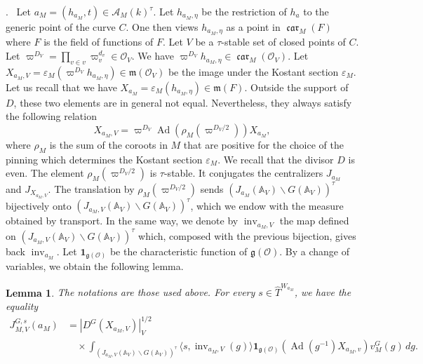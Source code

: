 \documentclass[12pt,a4paper,oneside,english,leqno]{smfart}
\makeatletter
\numberwithin{equation}{subsection}
\newcounter{theo}
\numberwithin{theo}{subsection}
\newenvironment{paragr}[1][]{\medskip\refstepcounter{subsection}%
  \par\noindent\hspace*{\parindent}\thesubsection.\ \emph{#1}%
  \@ifundefined{@empty}{}{}\ignorespaces}{\medskip}
\theoremstyle{plain}
\newtheorem{lemma}[theo]{Lemma}
\theoremstyle{definition}
\theoremstyle{remark}
\DeclareMathOperator{\Ad}{Ad}
\DeclareMathOperator{\inv}{inv}
\DeclareMathOperator{\car}{\mathfrak{car}}
\newcommand{\AAA}{\mathbb{A}}
\newcommand{\oc}{\mathcal{O}}
\newcommand{\Ac}{\mathcal{A}}
\newcommand{\Tc}{\widehat{T}}
\newcommand{\ggo}{\mathfrak{g}}
\newcommand{\mgo}{\mathfrak{m}}
\newcommand{\back}{\backslash}
\newcommand{\bg}{\langle}
\newcommand{\bd}{\rangle}
\newcommand{\eps}{\varepsilon}
\makeatother
\begin{document}
\begin{paragr}\label{S:17.5}
Let $a_M=(h_{a_M},t)\in\Ac_M(k)^\tau$. Let $h_{a_M,\eta}$ be the restriction of $h_a$ to the generic point of the curve $C$. One then views $h_{a_M,\eta}$ as a point in $\car_M(F)$ where $F$ is the field of functions of $F$. Let $V$ be a $\tau$-stable set of closed points of $C$. Let $\varpi^{D_V}=\prod_{v\in v}\varpi_v^{d_v}\in\oc_V$. We have $\varpi^{D_V}h_{a_M,\eta}\in\car_M(\oc_V)$. Let $X_{a_M,V}=\eps_M(\varpi^{D_V}h_{a_M,\eta})\in\mgo(\oc_V)$ be the image under the Kostant section $\eps_M$. Let us recall that we have $X_{a_M}=\eps_M(h_{a_M,\eta})\in\mgo(F)$. Outside the support of $D$, these two elements are in general not equal. Nevertheless, they always satisfy the following relation
$$
X_{a_M,V}=\varpi^{D_V}\Ad(\rho_M(\varpi^{D_V/2}))X_{a_M},
$$
where $\rho_M$ is the sum of the coroots in $M$ that are positive for the choice of the pinning which determines the Kostant section $\eps_M$. We recall that the divisor $D$ is even. The element $\rho_M(\varpi^{D_V/2})$ is $\tau$-stable. It conjugates the centralizers $J_{a_M}$ and $J_{X_{a_M,V}}$. The translation by $\rho_M(\varpi^{D_V/2})$ sends $(J_{a_M}(\AAA_V)\back G(\AAA_V))^\tau$ bijectively onto $(J_{a_M,V}(\AAA_V)\back G(\AAA_V))^\tau$, which we endow with the measure obtained by transport. In the same way, we denote by $\inv_{a_M,V}$ the map defined on $(J_{a_M,V}(\AAA_V)\back G(\AAA_V))^\tau$ which, composed with the previous bijection, gives back $\inv_{a_M}$. Let $\mathbf{1}_{\ggo(\oc)}$ be the characteristic function of $\ggo(\oc)$. By a change of variables, we obtain the following lemma.

\begin{lemma}\label{thm:17.5.1}
The notations are those used above. For every $s\in\Tc^{W_{a_M}}$, we have the equality
\[
\begin{aligned}
J^{G,s}_{M,V}(a_M)&=|D^G(X_{a_M,V})|_V^{1/2}\\
&\quad\times\int_{(J_{a_M,V}(\AAA_V)\back G(\AAA_V))^\tau}
\bg s,\inv_{a_M,V}(g)\bd\mathbf{1}_{\ggo(\oc)}(\Ad(g^{-1})X_{a_M,v})
v^G_M(g)\,dg.
\end{aligned}
\]
\end{lemma}
\end{paragr}
\end{document}
